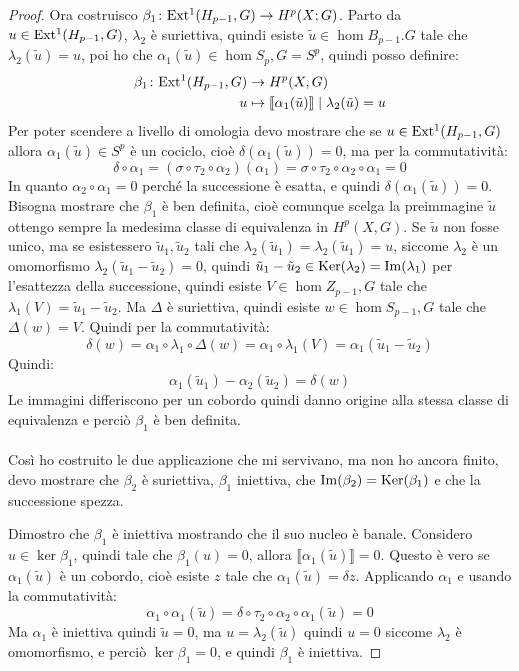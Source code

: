 \begin{proof}
  Ora costruisco $ \beta_1 \colon \mathrm{Ext^1}( H_{p-1}, G) \to H^p(X;G) $. Parto da $ u \in \mathrm{Ext^1}( H_{p-1}, G) $,
  $ \lambda_2 $ è suriettiva, quindi esiste $ \tilde{u} \in \hom{B_{p-1}.G} $ tale che
  $ \lambda_2(\tilde{u}) = u $, poi ho che $ \alpha_1(\tilde{u}) \in \hom{S_p, G} = S^p $,
  quindi posso definire:
  \begin{align*}
    \beta_1 \colon \mathrm{Ext^1}( H_{p-1}, G) & \to H^p(X,G) \\
    u & \mapsto \llbracket\alpha_1(\tilde{u})\rrbracket \; | \; \lambda_2(\tilde{u}) = u
  \end{align*}
  Per poter scendere a livello di omologia devo mostrare che se
  $ u \in \mathrm{Ext^1}( H_{p-1},G) $ allora $ \alpha_1(\tilde{u}) \in S^p $ è un cociclo, cioè
  $ \delta(\alpha_1(\tilde{u})) = 0 $, ma per la commutatività:
  \[
    \delta \circ \alpha_1 = (\sigma \circ \tau_2 \circ \alpha_2)(\alpha_1) = \sigma \circ \tau_2 \circ \alpha_2 \circ \alpha_1 = 0
  \]
  In quanto $ \alpha_2 \circ \alpha_1 = 0 $ perché la successione è esatta, e quindi
  $ \delta(\alpha_1(\tilde{u})) = 0 $. Bisogna mostrare che $ \beta_1 $ è ben definita, cioè
  comunque scelga la preimmagine $ \tilde{u} $ ottengo sempre la medesima classe
  di equivalenza in $ H^p(X,G) $. Se $ \tilde{u} $ non fosse unico, ma se
  esistessero $ \tilde{u}_1, \tilde{u}_2 $ tali che
  $ \lambda_2(\tilde{u}_1) = \lambda_2(\tilde{u}_1) = u $, siccome $ \lambda_2 $ è un omomorfismo
  $ \lambda_2(\tilde{u}_1 - \tilde{u}_2) = 0 $, quindi
  $ \tilde{u}_1 - \tilde{u}_2 \in \mathrm{Ker}( \lambda_2) = \mathrm{Im}( \lambda_1 ) $ per l'esattezza della
  successione, quindi esiste $ V \in \hom{Z_{p-1}, G} $ tale che
  $ \lambda_1(V) = \tilde{u}_1 - \tilde{u}_2 $. Ma $ \Delta $ è suriettiva, quindi esiste
  $ w \in \hom{S_{p-1}, G} $ tale che $ \Delta(w) = V $. Quindi per la commutatività:
  \[
    \delta(w) = \alpha_1 \circ \lambda_1 \circ \Delta (w) = \alpha_1 \circ \lambda_1 (V) = \alpha_1 ( \tilde{u}_1 - \tilde{u}_2 )
  \]
  Quindi:
  \[
    \alpha_1(\tilde{u}_1) - \alpha_2(\tilde{u}_2) = \delta(w)
  \]
  Le immagini differiscono per un cobordo quindi danno origine alla stessa
  classe di equivalenza e perciò $ \beta_1 $ è ben definita.
  \\ \\
  Così ho costruito le due applicazione che mi servivano, ma non ho ancora
  finito, devo mostrare che $ \beta_2 $ è suriettiva, $ \beta_1 $ iniettiva, che
  $ \mathrm{Im}( \beta_2 ) = \mathrm{Ker}( \beta_1) $ e che la successione spezza.

  Dimostro che $ \beta_1 $ è iniettiva mostrando che il suo nucleo è banale.
  Considero $ u \in \ker{\beta_1} $, quindi tale che $ \beta_1(u) = 0 $, allora
  $ \llbracket\alpha_1(\tilde{u})\rrbracket = 0 $. Questo è vero se
  $ \alpha_1(\tilde{u}) $ è un cobordo, cioè esiste $ z $ tale che
  $ \alpha_1(\tilde{u}) = \delta z $. Applicando $ \alpha_1 $ e usando la commutatività:
  \[
    \alpha_1 \circ \alpha_1 (\tilde{u}) = \delta \circ \tau_2 \circ \alpha_2 \circ \alpha_1 (\tilde{u}) = 0
  \]
  Ma $ \alpha_1 $ è iniettiva quindi $ \tilde{u} = 0 $, ma
  $ u = \lambda_2(\tilde{u})$ quindi $ u = 0 $ siccome $ \lambda_2 $ è omomorfismo, e perciò
  $ \ker{\beta_1} = 0 $, e quindi $ \beta_1 $ è iniettiva.


\end{proof}
